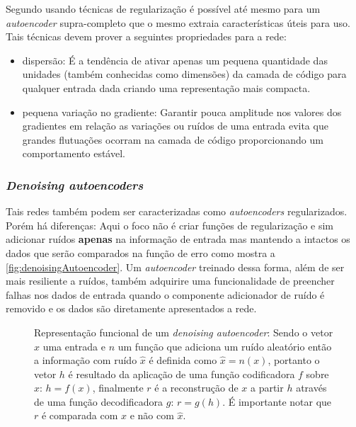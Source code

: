				\par Segundo \cite{Goodfellow-et-al-2016} usando técnicas de regularização é possível até mesmo para um \textit{autoencoder} supra-completo que o mesmo extraia características úteis para uso. Tais técnicas devem prover a seguintes propriedades para a rede:
				
				\begin{itemize}
					\item dispersão: É a tendência de ativar apenas um pequena quantidade das unidades (também conhecidas como dimensões) da camada de código para qualquer entrada dada criando uma representação mais compacta.
					\item pequena variação no gradiente: Garantir pouca amplitude nos valores dos gradientes em relação as variações ou ruídos de uma entrada evita que grandes flutuações ocorram na camada de código proporcionando um comportamento estável.
				\end{itemize}

				
			\subsubsection{\textit{Denoising autoencoders}}
				\par Tais redes também podem ser caracterizadas como \textit{autoencoders} regularizados. Porém há diferenças: Aqui o foco não é criar funções de regularização e sim adicionar ruídos \textbf{apenas} na informação de entrada mas mantendo a intactos os dados que serão comparados na função de erro como mostra a  \autoref{fig:denoisingAutoencoder}. Um \textit{autoencoder} treinado dessa forma, além de ser mais resiliente a ruídos, também adquirire uma funcionalidade de preencher falhas nos dados de entrada quando o componente adicionador de ruído é removido e os dados são diretamente apresentados a rede.
				
				\begin{figure}[H]
					\centering
					\caption[Representação funcional de um \textit{denoising autoencoder}]{Representação funcional de um \textit{denoising autoencoder}: Sendo o vetor $x$ uma entrada e $n$ um função que adiciona um ruído aleatório então a informação com ruído $\hat{x}$ é definida como $\hat{x} = n(x)$, portanto o vetor $h$ é resultado da aplicação de uma função codificadora $f$ sobre $x$: $h = f(x)$, finalmente $r$ é a reconstrução de $x$ a partir $h$ através de uma função decodificadora $g$: $r = g(h)$. É importante notar que $r$ é comparada com $x$ e não com $\hat{x}$.}
					
					\label{fig:denoisingAutoencoder}
				\end{figure}
							
